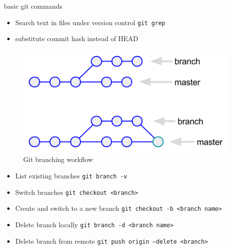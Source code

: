 \documentclass[10pt]{beamer}
\begin{document}
\begin{frame}{basic git commands}
\begin{itemize}
      \item Search text in files under version control \texttt{git grep}
      \item substitute commit hash instead of HEAD
      \end{itemize}
      \framebreak
      \begin{figure}
       \begin{center}
       \includegraphics[keepaspectratio, width=\textwidth,height=0.9\textheight-4\baselineskip]{img/001_git-branching.png}
      \end{center}
      \caption{Git branching workflow~\autocite{dzone}}
      \end{figure}
      \framebreak
      \begin{itemize}
      \item List existing branches \texttt{git branch -v}
      \item Switch branches \texttt{git checkout <branch>}
      \item Create and switch to a new branch \texttt{git checkout -b <branch name>}
      \item Delete branch locally \texttt{git branch -d <branch name>}
      
      \item Delete branch from remote \texttt{git push origin --delete <branch>}
      

\end{itemize}
\end{frame}
\end{document}
